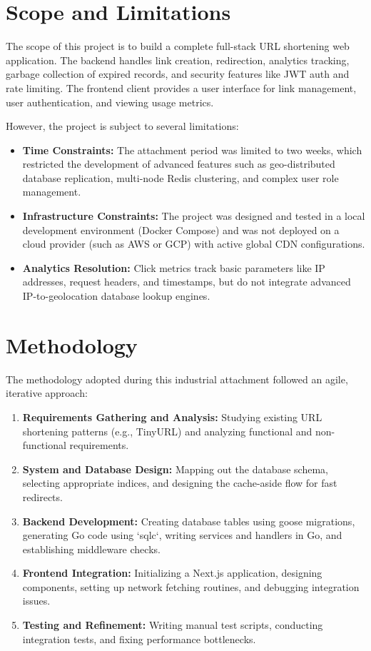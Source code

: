 \section{Scope and Limitations}
The scope of this project is to build a complete full-stack URL shortening web application. The backend handles link creation, redirection, analytics tracking, garbage collection of expired records, and security features like JWT auth and rate limiting. The frontend client provides a user interface for link management, user authentication, and viewing usage metrics.

However, the project is subject to several limitations:
\begin{itemize}
    \item \textbf{Time Constraints:} The attachment period was limited to two weeks, which restricted the development of advanced features such as geo-distributed database replication, multi-node Redis clustering, and complex user role management.
    \item \textbf{Infrastructure Constraints:} The project was designed and tested in a local development environment (Docker Compose) and was not deployed on a cloud provider (such as AWS or GCP) with active global CDN configurations.
    \item \textbf{Analytics Resolution:} Click metrics track basic parameters like IP addresses, request headers, and timestamps, but do not integrate advanced IP-to-geolocation database lookup engines.
\end{itemize}

\section{Methodology}
The methodology adopted during this industrial attachment followed an agile, iterative approach:
\begin{enumerate}
    \item \textbf{Requirements Gathering and Analysis:} Studying existing URL shortening patterns (e.g., TinyURL) and analyzing functional and non-functional requirements.
    \item \textbf{System and Database Design:} Mapping out the database schema, selecting appropriate indices, and designing the cache-aside flow for fast redirects.
    \item \textbf{Backend Development:} Creating database tables using goose migrations, generating Go code using `sqlc`, writing services and handlers in Go, and establishing middleware checks.
    \item \textbf{Frontend Integration:} Initializing a Next.js application, designing components, setting up network fetching routines, and debugging integration issues.
    \item \textbf{Testing and Refinement:} Writing manual test scripts, conducting integration tests, and fixing performance bottlenecks.
\end{enumerate}

